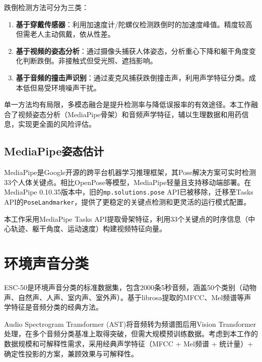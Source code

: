 跌倒检测方法可分为三类\cite{rachakonda2020cstick}：

\begin{enumerate}
    \item \textbf{基于穿戴传感器}：利用加速度计/陀螺仪检测跌倒时的加速度峰值。精度较高但需老人主动佩戴，依从性差。
    
    \item \textbf{基于视频的姿态分析}\cite{auvinet2010fall}：通过摄像头捕获人体姿态，分析重心下降和躯干角度变化判断跌倒。非接触式但受光照、遮挡影响。
    
    \item \textbf{基于音频的撞击声识别}\cite{popescu2009acoustic}：通过麦克风捕获跌倒撞击声，利用声学特征分类。成本低但易受环境噪声干扰。
\end{enumerate}

单一方法均有局限，多模态融合是提升检测率与降低误报率的有效途径。本工作融合了视频姿态分析（MediaPipe骨架）和音频声学特征，辅以生理数据和用药信息，实现更全面的风险评估。

\subsection{MediaPipe姿态估计}

MediaPipe\cite{lugaresi2019mediapipe}是Google开源的跨平台机器学习推理框架，其Pose解决方案可实时检测33个人体关键点。相比OpenPose等模型，MediaPipe轻量且支持移动端部署。在MediaPipe 0.10.35版本中，旧的\texttt{mp.solutions.pose} API已被移除，迁移至Tasks API的\texttt{PoseLandmarker}，提供了更稳定的关键点检测和更灵活的运行模式配置。

本工作采用MediaPipe Tasks API提取骨架特征，利用33个关键点的时序信息（中心轨迹、躯干角度、运动速度）构建视频特征向量。

\section{环境声音分类}

ESC-50\cite{piczak2015esc}是环境声音分类的标准数据集，包含2000条5秒音频，涵盖50个类别（动物声、自然声、人声、室内声、室外声）。基于librosa\cite{mcfee2015librosa}提取的MFCC、Mel频谱等声学特征是音频分类的经典方法。

Audio Spectrogram Transformer (AST)\cite{gong2021ast}将音频转为频谱图后用Vision Transformer处理，在多个音频分类基准上取得突破，但需大规模预训练数据。考虑到本工作的数据规模和可解释性需求，采用经典声学特征（MFCC + Mel频谱 + 统计量）+ 确定性投影的方案，兼顾效果与可解释性。

